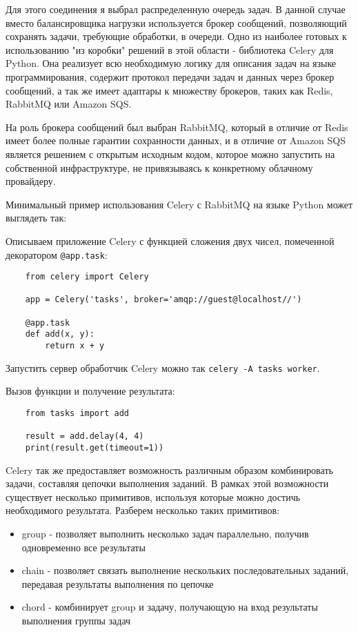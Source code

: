 Для этого соединения я выбрал распределенную очередь задач. В данной случае вместо балансировщика нагрузки используется брокер сообщений, позволяющий сохранять задачи, требующие обработки, в очереди. Одно из наиболее готовых к использованию "из коробки" решений в этой области - библиотека Celery для Python\cite{celery_website}. Она реализует всю необходимую логику для описания задач на языке программирования, содержит протокол передачи задач и данных через брокер сообщений, а так же имеет адаптары к множеству брокеров, таких как Redis, RabbitMQ или Amazon SQS.

На роль брокера сообщений был выбран RabbitMQ, который в отличие от Redis имеет более полные гарантии сохранности данных, и в отличие от Amazon SQS является решением с открытым исходным кодом, которое можно запустить на собственной инфраструктуре, не привязываясь к конкретному облачному провайдеру.

Минимальный пример использования Celery с RabbitMQ на языке Python может выглядеть так:

Описываем приложение Celery с функцией сложения двух чисел, помеченной декоратором \texttt{@app.task}:

\begin{lstlisting}
    from celery import Celery

    app = Celery('tasks', broker='amqp://guest@localhost//')

    @app.task
    def add(x, y):
        return x + y
\end{lstlisting}

Запустить сервер обработчик Celery можно так \texttt{celery -A tasks worker}.

Вызов функции и получение результата:

\begin{lstlisting}
    from tasks import add
    
    result = add.delay(4, 4)
    print(result.get(timeout=1))
\end{lstlisting}

Celery так же предоставляет возможность различным образом комбинировать задачи, составляя цепочки выполнения заданий. В рамках этой возможности существует несколько примитивов, используя которые можно достичь необходимого результата. Разберем несколько таких примитивов:

\begin{itemize}
    \item group - позволяет выполнить несколько задач параллельно, получив одновременно все результаты
    \item chain - позволяет связать выполнение нескольких последовательных заданий, передавая результаты выполнения по цепочке
    \item chord - комбинирует group и задачу, получающую на вход результаты выполнения группы задач 
\end{itemize}


